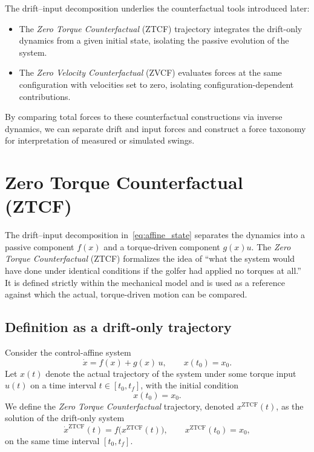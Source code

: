 \documentclass[12pt]{article}
\newcommand{\xd}{\dot{x}}
\begin{document}
The drift--input decomposition underlies the counterfactual tools introduced later:
\begin{itemize}
  \item The \emph{Zero Torque Counterfactual} (ZTCF) trajectory integrates the drift-only dynamics from a given initial state, isolating the passive evolution of the system.
  \item The \emph{Zero Velocity Counterfactual} (ZVCF) evaluates forces at the same configuration with velocities set to zero, isolating configuration-dependent contributions.
\end{itemize}
By comparing total forces to these counterfactual constructions via inverse dynamics, we can separate drift and input forces and construct a force taxonomy for interpretation of measured or simulated swings.

\section{Zero Torque Counterfactual (ZTCF)}
\label{sec:ztcf}

The drift--input decomposition in~\eqref{eq:affine_state} separates the dynamics into a passive component \(f(x)\) and a torque-driven component \(g(x)u\). The \emph{Zero Torque Counterfactual} (ZTCF) formalizes the idea of ``what the system would have done under identical conditions if the golfer had applied no torques at all.'' It is defined strictly within the mechanical model and is used as a reference against which the actual, torque-driven motion can be compared.

\subsection{Definition as a drift-only trajectory}

Consider the control-affine system
\begin{equation}
  \xd = f(x) + g(x)\,u, \qquad x(t_{0}) = x_{0}.
  \label{eq:affine_repeat}
\end{equation}
Let \(x(t)\) denote the actual trajectory of the system under some torque input \(u(t)\) on a time interval \(t \in [t_{0}, t_{f}]\), with the initial condition
\begin{equation}
  x(t_{0}) = x_{0}.
\end{equation}
We define the \emph{Zero Torque Counterfactual} trajectory, denoted \(x^{\mathrm{ZTCF}}(t)\), as the solution of the drift-only system
\begin{equation}
  \dot{x}^{\mathrm{ZTCF}}(t) = f\big(x^{\mathrm{ZTCF}}(t)\big), \qquad x^{\mathrm{ZTCF}}(t_{0}) = x_{0},
  \label{eq:ztcf_def}
\end{equation}
on the same time interval \([t_{0}, t_{f}]\).
\end{document}

